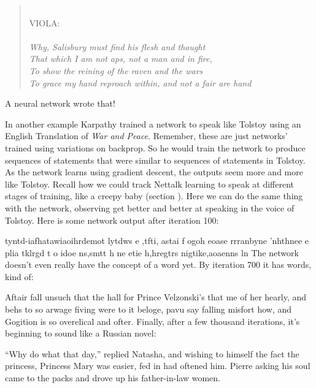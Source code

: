 \begin{quotation}
\hspace{5em} \\
VIOLA: \\ \\
\emph{Why, Salisbury must find his flesh and thought \\
That which I am not aps, not a man and in fire, \\
To show the reining of the raven and the wars \\
To grace my hand reproach within, and not a fair are hand}
\end{quotation}
A neural network wrote that! 

In another example Karpathy trained a network to speak like Tolstoy using an English Translation of \emph{War and Peace}. Remember, these are just networks' trained using variations on backprop.  So he would train the network to produce sequences of statements that were similar to sequences of statements in Tolstoy. As the network learns using gradient descent, the outputs seem more and more like Tolstoy. Recall how we could track Nettalk learning to speak at different stages of training, like a creepy baby (section ). Here we can do the same thing with the network, observing get better and better at speaking in the voice of Tolstoy. Here is some network output after iteration 100:

\newenvironment{myquote}
  {\list{}{\leftmargin=0.3in\rightmargin=0.3in}\item[]}
  {\endlist}
\begin{myquote}
tyntd-iafhatawiaoihrdemot  lytdws  e ,tfti, astai f ogoh eoase rrranbyne 'nhthnee e 
plia tklrgd t o idoe ns,smtt   h ne etie h,hregtrs nigtike,aoaenns ln
\end{myquote}
The network doesn't even really have the concept of a word yet. By iteration 700 it has words, kind of:
\begin{myquote}
Aftair fall unsuch that the hall for Prince Velzonski's that me of
her hearly, and behs to so arwage fiving were to it beloge, pavu say falling misfort 
how, and Gogition is so overelical and ofter.
\end{myquote}
Finally, after a few thousand iterations, it's beginning to sound like a Russian novel:
\begin{myquote}
``Why do what that day,'' replied Natasha, and wishing to himself the fact the
princess, Princess Mary was easier, fed in had oftened him. Pierre asking his soul came to the packs and drove up his father-in-law women.
\end{myquote}

